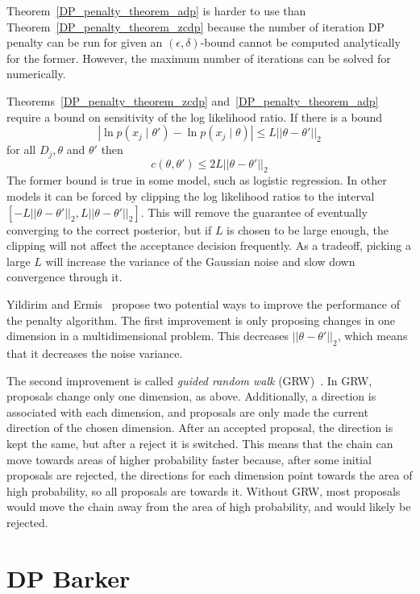\documentclass[english,twoside,openright]{HYgraduMLDS}
\begin{document}
Theorem~\ref{DP_penalty_theorem_adp} is harder to use than 
Theorem~\ref{DP_penalty_theorem_zcdp} because the number of iteration 
DP penalty can be run for given an \((\epsilon, \delta)\)-bound cannot be 
computed analytically for the former. However, the maximum number of iterations 
can be solved for numerically.

Theorems~\ref{DP_penalty_theorem_zcdp} and~\ref{DP_penalty_theorem_adp}
require a bound on sensitivity of the log likelihood ratio. If there is a bound 
\[
    |\ln p(x_j\mid \theta') - \ln p(x_j\mid \theta)| \leq L||\theta - \theta'||_2
\]
for all \(D_j, \theta\) and \(\theta'\) then 
\[
    c(\theta, \theta') \leq 2L||\theta - \theta'||_2
\]
The former bound is true in some model, such as logistic regression. In other 
models it can be forced by clipping the log likelihood ratios to the interval 
\([-L||\theta - \theta'||_2, L||\theta - \theta'||_2]\). This will remove the 
guarantee of eventually converging to the correct posterior, but if \(L\) is 
chosen to be large enough, the clipping will not affect the 
acceptance decision frequently. As a tradeoff, picking a large \(L\) will increase 
the variance of the Gaussian noise and slow down convergence through it.

Yildirim and Ermis~\cite{YildirimE19} propose two potential ways to improve the 
performance of the penalty algorithm. The first improvement is only proposing 
changes in one dimension in a multidimensional problem. This decreases 
\(||\theta - \theta'||_2\), which means that it decreases the noise variance.

The second improvement is called \emph{guided random walk} (GRW)~\cite{YildirimE19}.
In GRW, proposals change only one dimension, as above. Additionally, a direction 
is associated with each dimension, and proposals are only made the current 
direction of the chosen dimension. After an accepted proposal, the direction is 
kept the same, but after a reject it is switched. This means that the chain can
move towards areas of higher probability faster because, after some initial 
proposals are rejected, the directions for each dimension point towards the 
area of high probability, so all proposals are towards it. Without GRW, most 
proposals would move the chain away from the area of high probability, and 
would likely be rejected.

\section{DP Barker}
\end{document}
